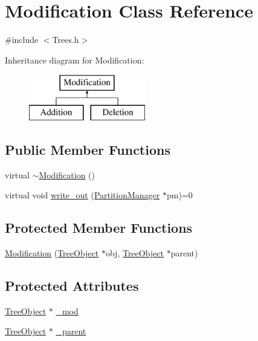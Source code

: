\hypertarget{class_modification}{}\section{Modification Class Reference}
\label{class_modification}


{\ttfamily \#include $<$Trees.\+h$>$}

Inheritance diagram for Modification\+:\begin{figure}[H]
\begin{center}
\leavevmode
\includegraphics[height=2.000000cm]{class_modification}
\end{center}
\end{figure}
\subsection*{Public Member Functions}
\begin{DoxyCompactItemize}
\item 
virtual \mbox{\hyperlink{class_modification_ab7f5ab083c3be2a3a26f40067b5d22dc}{$\sim$\+Modification}} ()
\item 
virtual void \mbox{\hyperlink{class_modification_a50d1fd809524902d2a1e78d02f4be1dc}{write\+\_\+out}} (\mbox{\hyperlink{class_partition_manager}{Partition\+Manager}} $\ast$pm)=0
\end{DoxyCompactItemize}
\subsection*{Protected Member Functions}
\begin{DoxyCompactItemize}
\item 
\mbox{\hyperlink{class_modification_a76407b8c6d2adb840dceea708355aba8}{Modification}} (\mbox{\hyperlink{class_tree_object}{Tree\+Object}} $\ast$obj, \mbox{\hyperlink{class_tree_object}{Tree\+Object}} $\ast$parent)
\end{DoxyCompactItemize}
\subsection*{Protected Attributes}
\begin{DoxyCompactItemize}
\item 
\mbox{\hyperlink{class_tree_object}{Tree\+Object}} $\ast$ \mbox{\hyperlink{class_modification_a0aa2f9924cde904b1683f3bd80d87a02}{\+\_\+mod}}
\item 
\mbox{\hyperlink{class_tree_object}{Tree\+Object}} $\ast$ \mbox{\hyperlink{class_modification_a529d02be9866b96746bcae63a763f868}{\+\_\+parent}}
\end{DoxyCompactItemize}


